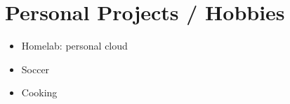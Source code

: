 \documentclass[letterpaper,11pt]{article}
\newcommand{\resumeItem}[1]{%
  \item\small{
    #1
  }
}
\newcommand{\resumeSubItem}[2]{\resumeItem{#1}{#2}\vspace{-4pt}}
\newcommand{\resumeSubHeadingListStart}{\begin{itemize}[leftmargin=*]}
\newcommand{\resumeSubHeadingListEnd}{\end{itemize}}
\begin{document}
\vspace{1em}
\section{Personal Projects / Hobbies}

  \resumeSubHeadingListStart
    \resumeSubItem{Homelab: personal cloud} \\
    \resumeSubItem{Soccer} \\
    \resumeSubItem{Cooking} \\
  \resumeSubHeadingListEnd

\vspace{1em}
\end{document}
